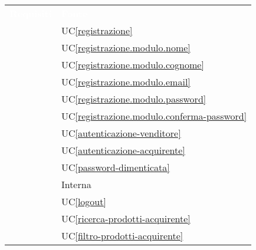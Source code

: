 \renewcommand{\arraystretch}{1.5}


\begin{longtable}{C{6cm} C{6cm}} 
	
	\textcolor{white}{\textbf{Requisiti}} &
	\textcolor{white}{\textbf{Fonte}} \\

     & UC\ref{registrazione} \\ 

     & UC\ref{registrazione.modulo.nome} \\

     & UC\ref{registrazione.modulo.cognome} \\

     & UC\ref{registrazione.modulo.email} \\

     & UC\ref{registrazione.modulo.password} \\

     & UC\ref{registrazione.modulo.conferma-password} \\

     & UC\ref{autenticazione-venditore} \\

     & UC\ref{autenticazione-acquirente} \\

     & UC\ref{password-dimenticata} \\

     & Interna \\

     & UC\ref{logout} \\

     & UC\ref{ricerca-prodotti-acquirente} \\

     & UC\ref{filtro-prodotti-acquirente} \\


\end{longtable}
